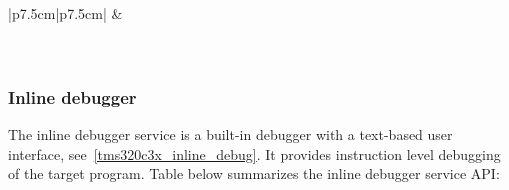 \begin{center}
\begin{supertabular}{|p{7.5cm}|p{7.5cm}|}
		\hline
		 & \\
		\\
		\\
		\hline
	\end{supertabular}
\end{center}

\newpage
\subsubsection{Inline debugger}
\label{tms320c3x_inline_debugger}

The inline debugger service is a built-in debugger with a text-based user interface, see~\ref{tms320c3x_inline_debug}. 
It provides instruction level debugging of the target program.
\noindent Table below summarizes the inline debugger service API:

